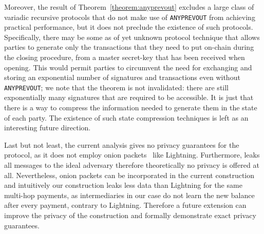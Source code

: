   Moreover, the result of Theorem~\ref{theorem:anyprevout} excludes a large
  class of variadic recursive protocols that do not make use of
  \texttt{ANYPREVOUT} from achieving practical performance, but it does not
  preclude the existence of such protocols. Specifically, there may be
  some as of yet unknown protocol technique that allows parties
  to generate only the transactions that they need to put on-chain during the
  closing procedure, from a master secret-key that has been received
  when opening. This would permit parties to circumvent the need for exchanging
  and storing an exponential number of signatures and transactions even without 
  \texttt{ANYPREVOUT}; we note that the theorem is not invalidated: there are still
  exponentially many signatures that are required to be accessible. It is just that 
  there is a way to compress the information needed to generate them in the state
  of each party. The existence of such state compression techniques is left as an 
  interesting future direction.

  Last but not least, the current analysis gives no privacy guarantees for the
  protocol, as it does not employ onion packets~\cite{sphinx} like Lightning.
  Furthermore, \fchan leaks all messages to the ideal adversary therefore
  theoretically no privacy is offered at all. Nevertheless, onion packets can be
  incorporated in the current construction and intuitively our construction
  leaks less data than Lightning for the same multi-hop payments, as
  intermediaries in our case do not learn the new balance after every payment,
  contrary to Lightning. Therefore a future extension can improve the privacy of
  the construction and formally demonstrate exact privacy guarantees.
